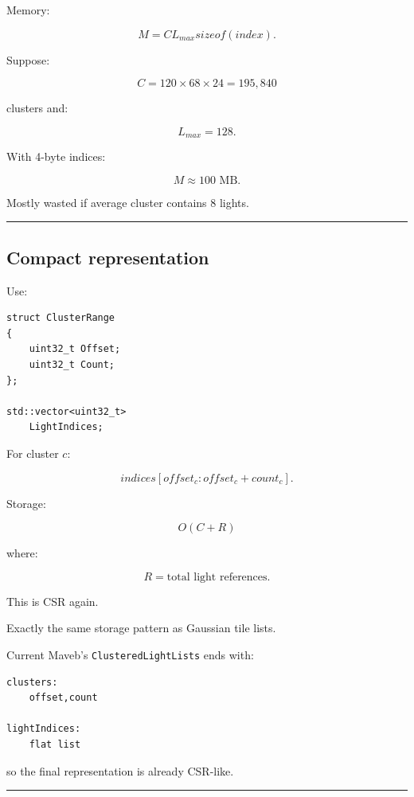 Memory:

\[
M=
C
L_{max}
sizeof(index).
\]

Suppose:

\[
C=120\times68\times24
=
195,840
\]

clusters and:

\[
L_{max}=128.
\]

With 4-byte indices:

\[
M\approx100\text{ MB}.
\]

Mostly wasted if average cluster contains 8 lights.

\begin{center}\rule{0.5\linewidth}{0.5pt}\end{center}

\subsection{Compact representation}\label{04-visual-computing-ii-ch040-compact-representation}

\hypertarget{04-visual-computing-ii-ch040-compact-representation}{}

Use:

\begin{verbatim}
struct ClusterRange
{
    uint32_t Offset;
    uint32_t Count;
};

std::vector<uint32_t>
    LightIndices;
\end{verbatim}

For cluster \(c\):

\[
indices[
offset_c:
offset_c+count_c
].
\]

Storage:

\[
O(C+R)
\]

where:

\[
R=
\text{total light references}.
\]

This is CSR again.

Exactly the same storage pattern as Gaussian tile lists.

Current Maveb's \texttt{ClusteredLightLists} ends with:

\begin{verbatim}
clusters:
    offset,count

lightIndices:
    flat list
\end{verbatim}

so the final representation is already CSR-like.

\begin{center}\rule{0.5\linewidth}{0.5pt}\end{center}

